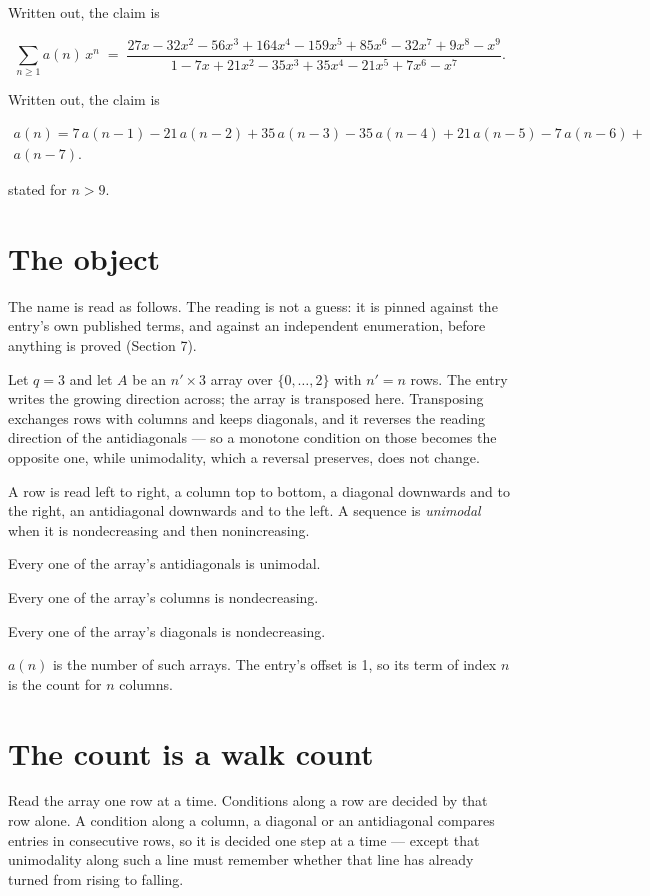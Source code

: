 \documentclass[11pt]{article}
\theoremstyle{definition}
\begin{document}
Written out, the claim is

\[\sum_{n \ge 1} a(n)\,x^n \;=\; \frac{27x - 32x^{2} - 56x^{3} + 164x^{4} - 159x^{5} + 85x^{6} - 32x^{7} + 9x^{8} - x^{9}}{1 - 7x + 21x^{2} - 35x^{3} + 35x^{4} - 21x^{5} + 7x^{6} - x^{7}}.\]

Written out, the claim is

\begin{multline*} a(n) = 7\,a(n-1) - 21\,a(n-2) + 35\,a(n-3) - 35\,a(n-4) + 21\,a(n-5) - 7\,a(n-6) + \\ a(n-7). \end{multline*}

stated for $n > 9$.

\section{The object}

The name is read as follows. The reading is not a guess: it is pinned against the entry's own published terms, and against an independent enumeration, before anything is proved (Section 7).

Let $q = 3$ and let $A$ be an $n' \times 3$ array over $\{0,\dots,2\}$ with $n' = n$ rows. The entry writes the growing direction across; the array is transposed here. Transposing exchanges rows with columns and keeps diagonals, and it reverses the reading direction of the antidiagonals --- so a monotone condition on those becomes the opposite one, while unimodality, which a reversal preserves, does not change.

A row is read left to right, a column top to bottom, a diagonal downwards and to the right, an antidiagonal downwards and to the left. A sequence is {\itshape unimodal} when it is nondecreasing and then nonincreasing.

Every one of the array's antidiagonals is unimodal.

Every one of the array's columns is nondecreasing.

Every one of the array's diagonals is nondecreasing.

$a(n)$ is the number of such arrays. The entry's offset is 1, so its term of index $n$ is the count for $n$ columns.

\section{The count is a walk count}

Read the array one row at a time. Conditions along a row are decided by that row alone. A condition along a column, a diagonal or an antidiagonal compares entries in consecutive rows, so it is decided one step at a time --- except that unimodality along such a line must remember whether that line has already turned from rising to falling.
\end{document}

